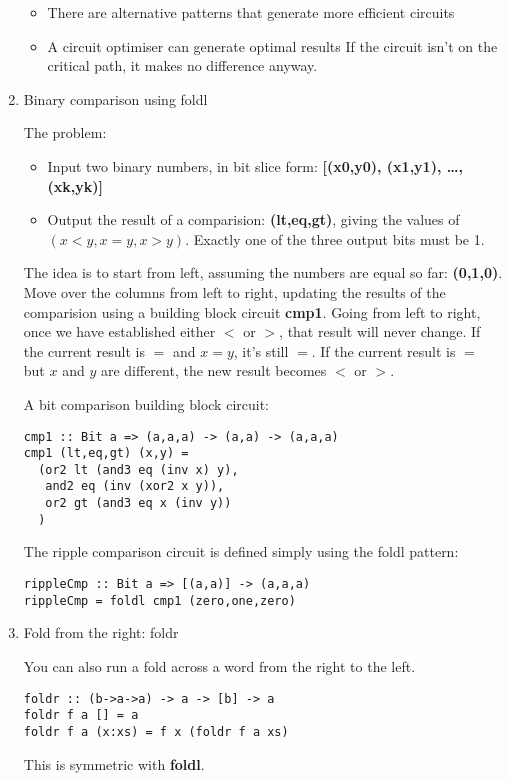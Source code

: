 \documentclass[11pt]{article}
\begin{document}
\begin{enumerate}
\begin{itemize}
\item There are alternative patterns that generate more efficient circuits
\item A circuit optimiser can generate optimal results If the circuit
isn't on the critical path, it makes no difference anyway.
\end{itemize}

\item Binary comparison using foldl
\label{sec:org0bebbec}

The problem:

\begin{itemize}
\item Input two binary numbers, in bit slice form:  \textbf{[(x0,y0), (x1,y1), \ldots{}, (xk,yk)]}
\item Output the result of a comparision: \textbf{(lt,eq,gt)}, giving the values
of \((x<y, x=y, x>y)\).  Exactly one of the three output bits must
be 1.
\end{itemize}

The idea is to start from left, assuming the numbers are equal so far:
\textbf{(0,1,0)}.  Move over the columns from left to right, updating the
results of the comparision using a building block circuit \textbf{cmp1}.
Going from left to right, once we have established either \(<\) or \(>\),
that result will never change.  If the current result is \(=\) and
\(x=y\), it's still \(=\).  If the current result is \(=\) but \(x\) and \(y\)
are different, the new result becomes \(<\) or \(>\).

A bit comparison building block circuit:

\begin{verbatim}
cmp1 :: Bit a => (a,a,a) -> (a,a) -> (a,a,a)
cmp1 (lt,eq,gt) (x,y) =
  (or2 lt (and3 eq (inv x) y),
   and2 eq (inv (xor2 x y)),
   or2 gt (and3 eq x (inv y))
  )
\end{verbatim}

The ripple comparison circuit is defined simply using the foldl pattern:

\begin{verbatim}
rippleCmp :: Bit a => [(a,a)] -> (a,a,a)
rippleCmp = foldl cmp1 (zero,one,zero)
\end{verbatim}

\item Fold from the right: foldr
\label{sec:org1c6f37d}

You can also run a fold across a word from the right to the left.

\begin{verbatim}
foldr :: (b->a->a) -> a -> [b] -> a
foldr f a [] = a
foldr f a (x:xs) = f x (foldr f a xs)
\end{verbatim}

This is symmetric with \textbf{foldl}.
\end{enumerate}
\end{document}
